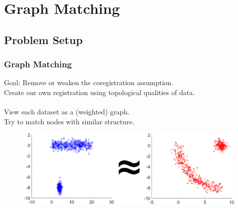 \documentclass{beamer}
\begin{document}
\section{Graph Matching}
\subsection{Problem Setup}
\begin{frame}
  \frametitle{Graph Matching}
  Goal: Remove or weaken the coregistration assumption.\\
  Create our own registration using topological qualities of data.\\~\\
  View each dataset as a (weighted) graph.\\
  Try to match nodes with similar structure.
  \begin{figure}[ht]
    \centering
    \includegraphics[width=\textwidth]{./Images/GraphMatch/CombinePic/ApproxEq.png}
  \end{figure}  
\end{frame}
\end{document}
